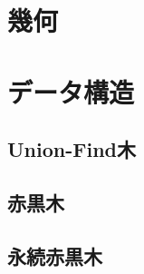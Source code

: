 \documentclass[9pt,twocolumn,a4paper,landscape]{extarticle}
\begin{document}
\section{幾何}



\section{データ構造}
\subsection{Union-Find木}

\subsection{赤黒木}

\subsection{永続赤黒木}

\end{document}
